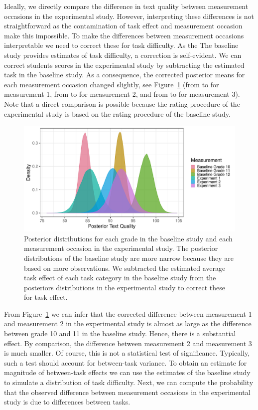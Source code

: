 \documentclass[a4paper]{article}
\newcommand{\getVal}[3]{%
	\pgfplotstablegetelem{#1}{#2}\of{#3}%
	\pgfmathprintnumber{\pgfplotsretval}%
}
\begin{document}
Ideally, we directly compare the difference in text quality between measurement occasions in the experimental study. However, interpreting these differences is not straightforward as the contamination of task effect and measurement occasion make this impossible. To make the differences between measurement occasions interpretable we need to correct these for task difficulty. As the The baseline study provides estimates of task difficulty, a correction is self-evident.  We can correct students scores in the experimental study by subtracting the estimated task in the baseline study. As a consequence, the corrected posterior means for each measurement occasion changed slightly, see Figure~\ref{fig:comparePostTextQual} (from \getVal{0}{Mean}{\tbPostMeansProdCC} to \getVal{3}{Mean}{\tbPostMeansProdCC} for measurement 1, from \getVal{1}{Mean}{\tbPostMeansProdCC} to \getVal{4}{Mean}{\tbPostMeansProdCC} for measurement 2, and from \getVal{2}{Mean}{\tbPostMeansProdCC} to \getVal{5}{Mean}{\tbPostMeansProdCC} for measurement 3). Note that a direct comparison is possible because the rating procedure of the experimental study is based on the rating procedure of the baseline study.
\begin{figure}[!ht]
	\includegraphics[width=\textwidth]{comparePosteriorTextQuality.pdf}
	\caption{Posterior distributions for each grade in the baseline study and each measurement occasion in the experimental study. The posterior distributions of the baseline study are more narrow because they are based on more observations. We subtracted the estimated average task effect of each task category in the baseline study from the posteriors distributions in the experimental study to correct these for task effect.}
	\label{fig:comparePostTextQual}
\end{figure}

From Figure~\ref{fig:comparePostTextQual} we can infer that the corrected difference between measurement 1 and measurement 2 in the experimental study is almost as large as the difference between grade 10 and 11 in the baseline study. Hence, there is a substantial effect. By comparison, the difference between measurement 2 and measurement 3 is much smaller. Of course, this is not a statistical test of significance. Typically, such a test should account for between-task variance. To obtain an estimate for magnitude of between-task effects we can use the estimates of the baseline study to simulate a distribution of task difficulty. Next, we can compute the probability that the observed difference between measurement occasions in the experimental study is due to differences between tasks.
\end{document}
